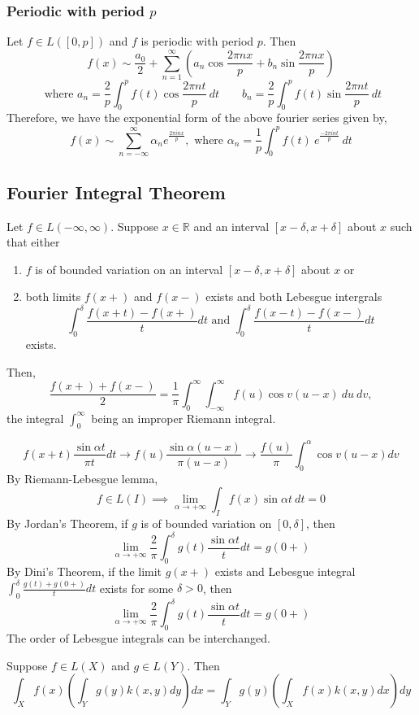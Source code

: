 \subsubsection{Periodic with period $p$}
Let \(f \in L([0,p])\) and $f$ is periodic with period $p$.
Then
\[ f(x) \sim \frac{a_0}{2} + \sum_{n=1}^\infty \left( a_n \cos \frac{2\pi nx}{p} + b_n \sin \frac{2\pi nx}{p} \right) \]
\[ \text{ where } a_n = \frac{2}{p} \int_0^p f(t) \cos \frac{2\pi nt}{p}\ dt \qquad b_n = \frac{2}{p} \int_0^p f(t) \sin \frac{2\pi nt}{p}\ dt \]
Therefore, we have the exponential form of the above fourier series given by,
\[ f(x) \sim \sum_{n = -\infty}^\infty \alpha_n e^\frac{2\pi inx}{p},\text{ where } \alpha_n = \frac{1}{p} \int_0^p f(t)\ e^\frac{-2\pi int}{p}\ dt \]
	
\subsection{Fourier Integral Theorem}
\begin{theorem}
Let \(f \in L(-\infty,\infty)\).
Suppose \(x \in \mathbb{R}\) and an interval $[x-\delta,x+\delta]$ about $x$ such that either 
\begin{enumerate}
	\item $f$ is of bounded variation on an interval $[x-\delta,x+\delta]$ about $x$ or
	\item both limits $f(x+)$ and $f(x-)$ exists and both Lebesgue intergrals \[ \int_0^\delta \frac{f(x+t)-f(x+)}{t} dt \text{ and }\int_0^\delta \frac{f(x-t)-f(x-)}{t} dt \] exists.
\end{enumerate}
Then, 
\[ \frac{f(x+)+f(x-)}{2} = \frac{1}{\pi} \int_0^\infty \int_{-\infty}^\infty f(u)\cos v(u-x)\ du\ dv, \] the integral $\int_0^\infty$ being an improper Riemann integral.
\end{theorem}
\begin{synopsis}
\[ f(x+t)\frac{\sin \alpha t}{\pi t} dt \to f(u)\frac{\sin \alpha(u-x)}{\pi(u-x)} \to \frac{f(u)}{\pi} \int_0^\alpha \cos v(u-x) dv \]
By Riemann-Lebesgue lemma\cite[Theorem 11.6]{apostol},
\[ f \in L(I) \implies \lim_{\alpha \to +\infty} \int_I f(x) \sin \alpha t\ dt = 0 \]
By Jordan's Theorem\cite[Theorem 10.8]{apostol}, if $g$ is of bounded variation on $[0,\delta]$, then
\[ \lim_{\alpha \to +\infty} \frac{2}{\pi} \int_0^\delta g(t) \frac{\sin \alpha t}{t} dt = g(0+) \]
By Dini's Theorem\cite[Theorem 10.9]{apostol}, if the limit $g(x+)$ exists and Lebesgue integral \( \int_0^\delta \frac{g(t)+g(0+)}{t} dt \) exists for some \( \delta > 0 \), then
\[ \lim_{\alpha \to +\infty} \frac{2}{\pi} \int_0^\delta g(t) \frac{\sin \alpha t}{t} dt = g(0+) \]
The order of Lebesgue integrals can be interchanged.\cite[Theorem 10.40]{apostol}

Suppose \(f \in L(X)\) and \(g \in L(Y)\).
Then \[ \int_X f(x) \left(\int_Y g(y) k(x,y) dy \right) dx = \int_Y g(y) \left( \int_X f(x) k(x,y) dx \right) dy \]
\end{synopsis}
